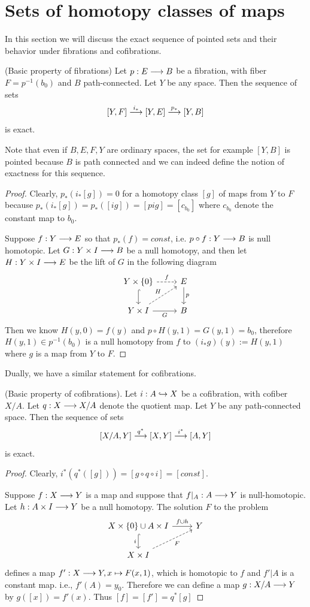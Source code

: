 \documentclass[11pt]{book} %
\begin{document}
\section{Sets of homotopy classes of maps}
In this section we will discuss the exact sequence of pointed sets and their behavior under fibrations and cofibrations.
\begin{theorem}
(Basic property of fibrations) Let $p: E\longrightarrow B$ be a fibration, with fiber $F=p^{-1}(b_0)$ and $B$ path-connected. Let $Y$ be any space. Then the sequence of sets
$$
[Y,F]\overset{i_*}{\longrightarrow}[Y,E]\overset{p_*}{\longrightarrow}[Y,B]
$$
is exact.
\end{theorem}
Note that even if $B,E,F, Y$ are ordinary spaces, the set for example $[Y,B]$ is pointed because $B$ is path connected and we can indeed define the notion of exactness for this sequence.
\begin{proof}
Clearly, $p_*(i_*[g])=0$ for a homotopy class $[g]$ of maps from $Y$ to $F$ because $p_*(i_*[g])=p_*([i g])=[pig]=[c_{b_0}]$ where $c_{b_0}$ denote the constant map to $b_0$.

Suppose $f: Y\longrightarrow E$ so that $p_*(f)=const$, i.e. $p\circ f: Y\longrightarrow B$ is null homotopic. Let $G: Y\times I\longrightarrow B$ be a null homotopy, and then let $H: Y\times I\longrightarrow E$ be the lift of $G$ in the following diagram
$$
\begin{tikzcd}
Y\times\{0\} \arrow[d, hook] \arrow[r, "f", dashed] & E \arrow[d, "p"] \\
Y\times I \arrow[r, "G"'] \arrow[ru, "H", dashed] & B
\end{tikzcd}
$$
Then we know $ H(y,0)=f(y)$ and $p\circ H(y,1)=G(y,1)=b_0$, therefore $H(y,1)\in p^{-1}(b_0)$ is a null homotopy from $f$ to $(i_*g)(y):=H(y,1)$ where $g$ is a map from $Y$ to $F$.
\end{proof}

Dually, we have a similar statement for cofibrations.
\begin{theorem}(Basic property of cofibrations). Let $i:A\hookrightarrow X$ be a cofibration, with cofiber $X/A$. Let $q: X\longrightarrow X/A$ denote the quotient map. Let $Y$ be any path-connected space. Then the sequence of sets
$$
[X/A, Y]\overset{q^*}{\longrightarrow}[X,Y]\overset{i^*}{\longrightarrow}[A,Y]
$$ 
is exact.
\end{theorem}
\begin{proof}
Clearly, $i^*(q^*([g]))=[g\circ q\circ i]=[const]$.

Suppose $f:X\longrightarrow Y$ is a map and suppose that $f|_A: A\longrightarrow Y$ is null-homotopic. Let $h: A\times I\longrightarrow Y$ be a null homotopy. The solution $F$ to the problem
$$
\begin{tikzcd}
X\times \{0\}\cup A\times I \arrow[r, "f\cup h"] \arrow[d, "i"', hook] & Y \\
X\times I \arrow[ru, "F"', dashed] & 
\end{tikzcd}
$$
defines a map $f':X\longrightarrow Y,x\mapsto F(x,1)$, which is homotopic to $f$ and $f'|A$ is a constant map. i.e., $f'(A)=y_0$. Therefore we can define a map $g:X/A\longrightarrow Y$ by $g([x])=f'(x)$. Thus $[f]=[f']=q^*[g]$
\end{proof}
\end{document}
